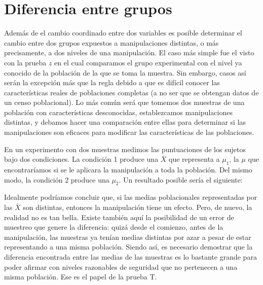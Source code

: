 \documentclass[a4paper,12pt]{article}
\begin{document}
\section{Diferencia entre grupos}\label{diferenciaentregrupos}

Además de el cambio coordinado entre dos variables es posible determinar el cambio entre dos grupos expuestos a manipulaciones distintas, o más precisamente, a dos niveles de una manipulación. El caso más simple fue el visto con la prueba $z$ en el cual comparamos el grupo experimental con el nivel ya conocido de la población de la que se toma la muestra. Sin embargo, casos así serán la excepción más que la regla debido a que es difícil conocer las características reales de poblaciones completas (a no ser que se obtengan datos de un censo poblacional). Lo más común será que tomemos dos muestras de una población con características desconocidas, establezcamos manipulaciones distintas, y debamos hacer una comparación entre ellas para determinar si las manipulaciones son eficaces para modificar las características de las poblaciones.

En un experimento con dos muestras medimos las puntuaciones de los sujetos bajo dos condiciones. La condición 1 produce una ${\bar{X}}$ que representa a $\mu_{1}$, la $\mu$ que encontraríamos si se le aplicara la manipulación a toda la población. Del mismo modo, la condición 2 produce una $\mu_{2}$. Un resultado posible sería el siguiente:


Idealmente podríamos concluir que, si las medias poblacionales representadas por las $\bar{X}$ son distintas, entonces la manipulación tiene un efecto. Pero, de nuevo, la realidad no es tan bella. Existe también aquí la posibilidad de un error de muestreo que genere la diferencia: quizá desde el comienzo, antes de la manipulación, las muestras ya tenían medias distintas por azar a pesar de estar representando a una misma población. Siendo así, es necesario demostrar que la diferencia encontrada entre las medias de las muestras es lo bastante grande para poder afirmar con niveles razonables de seguridad que no pertenecen a una misma población. Ese es el papel de la prueba T.
\end{document}
